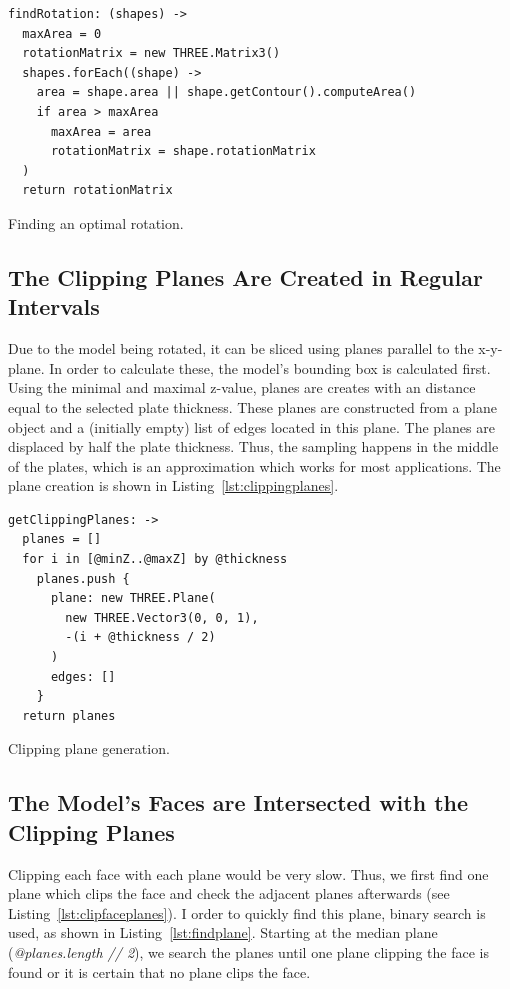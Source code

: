 \documentclass[../ClassicThesis.tex]{subfiles}
\begin{document}
\begin{listing}
\begin{verbatim}
findRotation: (shapes) ->
  maxArea = 0
  rotationMatrix = new THREE.Matrix3()
  shapes.forEach((shape) ->
    area = shape.area || shape.getContour().computeArea()
    if area > maxArea
      maxArea = area
      rotationMatrix = shape.rotationMatrix
  )
  return rotationMatrix
\end{verbatim}
\caption{Finding an optimal rotation.}
\label{lst:findrotation}
\end{listing}

\subsection{The Clipping Planes Are Created in Regular Intervals}

Due to the model being rotated, it can be sliced using planes parallel to the x-y-plane. In order to calculate these, the model's bounding box is calculated first. Using the minimal and maximal z-value, planes are creates with an distance equal to the selected plate thickness. These planes are constructed from a {\threejs} plane object and a (initially empty) list of edges located in this plane. The planes are displaced by half the plate thickness. Thus, the sampling happens in the middle of the plates, which is an approximation which works for most applications. The plane creation is shown in Listing~\ref{lst:clippingplanes}.

\begin{listing}
\begin{verbatim}
getClippingPlanes: ->
  planes = []
  for i in [@minZ..@maxZ] by @thickness
    planes.push {
      plane: new THREE.Plane(
        new THREE.Vector3(0, 0, 1), 
        -(i + @thickness / 2)
      )
      edges: []
    }
  return planes
\end{verbatim}
\caption{Clipping plane generation.}
\label{lst:clippingplanes}
\end{listing}

\subsection{The Model's Faces are Intersected with the Clipping Planes}

Clipping each face with each plane would be very slow. Thus, we first find one plane which clips the face and check the adjacent planes afterwards (see Listing~\ref{lst:clipfaceplanes}). I order to quickly find this plane, binary search is used, as shown in Listing~\ref{lst:findplane}. Starting at the median plane (\emph{@planes.length // 2}), we search the planes until one plane clipping the face is found or it is certain that no plane clips the face.
\end{document}
